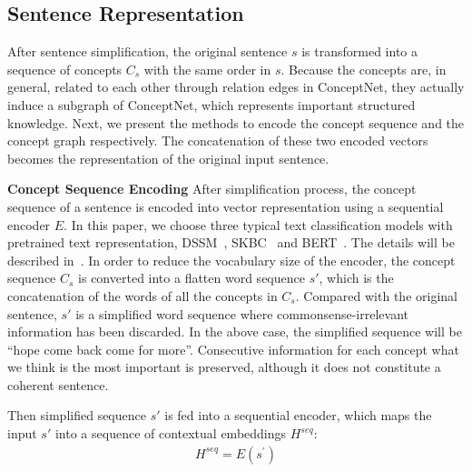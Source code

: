 \subsection{Sentence Representation}
\label{sec:represent}
After sentence simplification, the original sentence $s$ is transformed into
a sequence of concepts $C_s$ with the same order in $s$. Because the 
concepts are, in general, related to each other through relation edges in
ConceptNet, they actually induce a subgraph of ConceptNet, which represents
important structured knowledge. Next, we present the methods to
encode the concept sequence and the concept graph respectively.
The concatenation of these two encoded vectors becomes the 
representation of the original input sentence.  

\textbf{Concept Sequence Encoding}
After simplification process, the concept sequence of a sentence
is encoded into vector representation using a sequential encoder $E$. 
In this paper, we choose three typical text classification models with pretrained text representation,
DSSM~\cite{huang2013learning}, SKBC~\cite{roemmele2017rnn} and
 BERT~\cite{devlin2018bert}. The details will be described in~.
In order to reduce the vocabulary size of the encoder, 
the concept sequence $C_s$ is converted into a flatten word sequence $s'$,
which is the concatenation of the words of all the concepts in $C_s$.
Compared with the original sentence, $s'$ is a simplified word sequence
where commonsense-irrelevant information has been discarded. 
In the above case, the simplified sequence will be 
``hope come back come for more''. 
Consecutive information for each concept what we 
think is the most important is preserved, 
although it does not constitute a coherent sentence.

Then simplified sequence $s'$ is fed into a sequential encoder,
which maps the input $s'$ into a sequence
of contextual embeddings $H^{seq}$:
\begin{equation}
\begin{aligned}
 H^{seq} = E\left(s^{'}\right)
\end{aligned}
\end{equation}
\noindent

